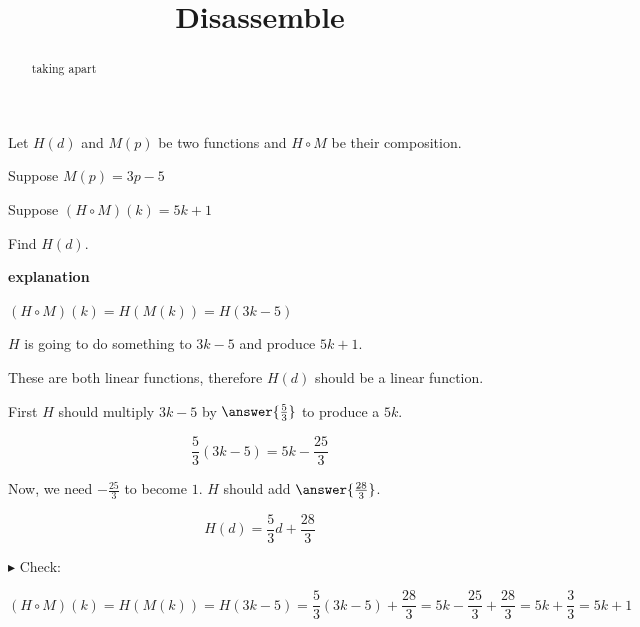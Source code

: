 \documentclass{ximera}
\title{Disassemble}
\begin{document}
\begin{abstract}
taking apart
\end{abstract}
\maketitle





\begin{example}


Let $H(d)$ and $M(p)$ be two functions and $H \circ M$ be their composition.


Suppose $M(p) = 3 p - 5$ 

Suppose $(H \circ M)(k) = 5 k + 1$


Find $H(d)$.



\textbf{\textcolor{red!75!green}{explanation}} 




$(H \circ M)(k) = H(M(k)) = H(3 k - 5)$  



$H$ is going to do something to $3 k - 5$ and produce $5 k + 1$. 




These are both linear functions, therefore $H(d)$ should be a linear function.


First $H$ should multiply $3 k - 5$ by $\answer{\frac{5}{3}}$ to produce a $5k$.


\[    \frac{5}{3} (3 k - 5) = 5k - \frac{25}{3}   \]



Now, we need $-\frac{25}{3}$ to become $1$.  $H$ should add $\answer{\frac{28}{3}}$.

\[  H(d) =    \frac{5}{3} d +     \frac{28}{3} \]



$\blacktriangleright$ Check: 


\[    (H \circ M)(k) = H(M(k)) = H(3 k - 5) =    \frac{5}{3} (3 k - 5) +     \frac{28}{3}  = 5k - \frac{25}{3}  + \frac{28}{3}  = 5k + \frac{3}{3}  = 5k + 1\]







\end{example}
\end{document}
